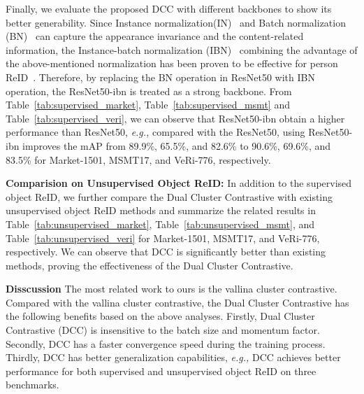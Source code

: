 \documentclass[10pt,twocolumn,letterpaper]{article}
\begin{document}
Finally, we evaluate the proposed DCC with different backbones to show its better generability.
Since Instance normalization(IN)~\cite{DBLP:conf/cvpr/UlyanovVL17} and Batch normalization (BN)~\cite{DBLP:conf/icml/IoffeS15} can capture the appearance invariance and the content-related information, the Instance-batch normalization (IBN)~\cite{DBLP:conf/eccv/PanLST18} combining the advantage of the above-mentioned normalization has been proven to be effective for person ReID~\cite{he2020fastreid}.
Therefore, by replacing the BN operation in ResNet50 with IBN operation,  the ResNet50-ibn is treated as a strong backbone.
From Table~\ref{tab:supervised_market}, Table~\ref{tab:supervised_msmt} and Table~\ref{tab:supervised_veri}, we can observe that ResNet50-ibn obtain a higher performance than ResNet50, \emph{e.g.,} compared with the ResNet50, using ResNet50-ibn improves the mAP from 89.9\%, 65.5\%, and 82.6\% to 90.6\%, 69.6\%, and 83.5\% for Market-1501, MSMT17, and VeRi-776, respectively.

\textbf{Comparision on Unsupervised Object ReID:}
In addition to the supervised object ReID, we further compare the Dual Cluster Contrastive with existing unsupervised object ReID methods and summarize the related results in Table~\ref{tab:unsupervised_market}, Table~\ref{tab:unsupervised_msmt}, and Table~\ref{tab:unsupervised_veri} for Market-1501, MSMT17, and VeRi-776, respectively.
We can observe that DCC is significantly better than existing methods, proving the effectiveness of the Dual Cluster Contrastive.

\textbf{Disscussion}
The most related work to ours is the vallina cluster contrastive.
Compared with the vallina cluster contrastive, the Dual Cluster Contrastive has the following benefits based on the above analyses.
Firstly, Dual Cluster Contrastive (DCC) is insensitive to the batch size and momentum factor.
Secondly, DCC has a faster convergence speed during the training process. 
Thirdly, DCC has better generalization capabilities, \emph{e.g.,} DCC achieves better performance for both supervised and unsupervised object ReID on three benchmarks. 
\end{document}
